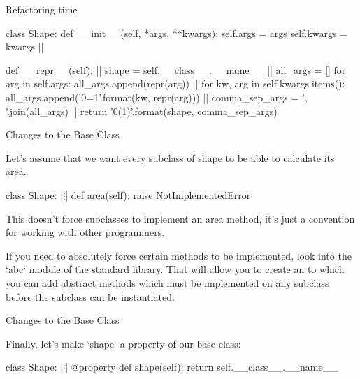 \documentclass[aspectratio=149, handout] {beamer}
\begin{document}
\begin{frame}[fragile]{Refactoring time}

\small
\begin{pythoncode}
  class Shape:
      def __init__(self, *args, **kwargs): 
          self.args = args
          self.kwargs = kwargs |\pause|

      def __repr__(self): |\pause|
          shape = self.__class__.__name__ |\pause|
          all_args = []
          for arg in self.args:
              all_args.append(repr(arg))  |\pause|
          for kw, arg in self.kwargs.items():
              all_args.append('{0}={1}'.format(kw, repr(arg)))  |\pause|
          comma_sep_args = ', '.join(all_args) |\pause|
          return '{0}({1})'.format(shape, comma_sep_args)
\end{pythoncode}


\end{frame}


\begin{frame}[fragile]{Changes to the Base Class}

  Let's assume that we want every subclass of shape to be able to calculate its area.

  \pause

  \begin{pythoncode}
    class Shape:
            |$\vdots$|
        def area(self):
            raise NotImplementedError
        
  \end{pythoncode}
  
  \medskip \pause
  
  This doesn't force subclasses to implement an area method, 
  it's just a convention for working with other programmers.
  
  \smallskip \pause
  
  If you need to absolutely force certain methods to be implemented, 
  look into the  \inline`abc` module of the standard library.
  That will allow you to create an  
  to which you can add abstract methods which must be implemented on 
  any subclass before the subclass can be instantiated. 


\end{frame}


\begin{frame}[fragile]{Changes to the Base Class}

Finally, let's make \inline`shape` a property of our base class:


  \begin{pythoncode}
    class Shape:
            |$\vdots$|
        @property
        def shape(self):
            return self.__class__.__name__

  \end{pythoncode}



\end{frame}
\end{document}
